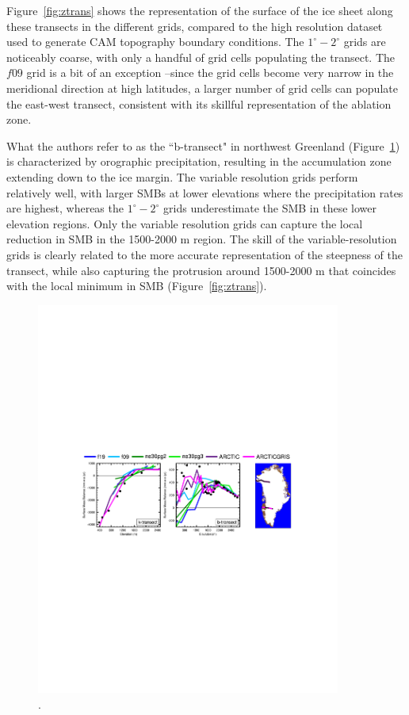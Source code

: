 \documentclass[draft]{agujournal2019}
\begin{document}
Figure~\ref{fig:ztrans} shows the representation of the surface of the ice sheet along these transects in the different grids, compared to the high resolution dataset used to generate CAM topography boundary conditions. The $1^{\circ}-2^{\circ}$ grids are noticeably coarse, with only a handful of grid cells populating the transect. The $f09$ grid is a bit of an exception --since the grid cells become very narrow in the meridional direction at high latitudes, a larger number of grid cells can populate the east-west transect, consistent with its skillful representation of the ablation zone.

What the authors refer to as the ``b-transect" in northwest Greenland (Figure~\ref{fig:trans}) is characterized by orographic precipitation, resulting in the accumulation zone extending down to the ice margin. The variable resolution grids perform relatively well, with larger SMBs at lower elevations where the precipitation rates are highest, whereas the $1^{\circ}-2^{\circ}$ grids underestimate the SMB in these lower elevation regions. Only the variable resolution grids can capture the local reduction in SMB in the 1500-2000 m region. The skill of the variable-resolution grids is clearly related to the more accurate representation of the steepness of the transect, while also capturing the protrusion around 1500-2000 m that coincides with the local minimum in SMB (Figure~\ref{fig:ztrans}).

\begin{figure}[t]
\begin{center}
         \includegraphics[width=100mm]{figs/temp_transect_obsperiod.pdf}
\end{center}
\caption{.}
\label{fig:trans}
\end{figure}
\end{document}
